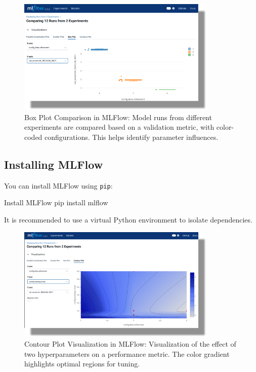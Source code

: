 \begin{figure}[htbp]
    \centering
    \includegraphics[width=0.85\textwidth]{images/mlflow03.png}
    \caption{Box Plot Comparison in MLFlow: Model runs from different experiments are compared based on a validation metric, with color-coded configurations. This helps identify parameter influences.}
    \label{fig:mlflow_boxplot}
\end{figure}

%
\subsection{Installing MLFlow}

You can install MLFlow using \texttt{pip}:

\begin{codeonly}{Install MLFlow}
pip install mlflow
\end{codeonly}

It is recommended to use a virtual Python environment to isolate dependencies.

\begin{figure}[htbp]
    \centering
    \includegraphics[width=0.85\textwidth]{images/mlflow04.png}
    \caption{Contour Plot Visualization in MLFlow: Visualization of the effect of two hyperparameters on a performance metric. The color gradient highlights optimal regions for tuning.}
    \label{fig:mlflow_contour}
\end{figure}

